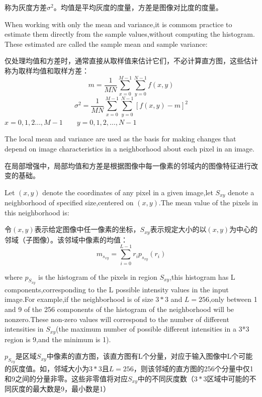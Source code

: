 \documentclass[12pt]{article}
\numberwithin{equation}{section}%
\begin{document}
称为灰度方差$\sigma^{2}$。均值是平均灰度的度量，方差是图像对比度的度量。

When working with only the mean and variance,it is commom practice to estimate them directly from the sample values,without computing the histogram. These estimated are called the sample mean and sample variance:

仅处理均值和方差时，通常直接从取样值来估计它们，不必计算直方图，这些估计称为取样均值和取样方差：
\begin{equation} \label {3.20}
m=\frac{1}{MN}\sum_{x=0}^{M-1}\sum_{y=0}^{N-1}f(x,y)
\end{equation}
\begin{equation} \label {3.21}
\sigma^{2}=\frac{1}{MN}\sum_{x=0}^{M-1}\sum_{y=0}^{N-1}[f(x,y)-m]^{2}
\end{equation}
$x=0,1,2\ldots,M-1\qquad y=0,1,2,\ldots,N-1$

The local mean and variance are used as the basis for making changes that depend on image characteristics in a neighborhood about each pixel in an image.

在局部增强中，局部均值和方差是根据图像中每一像素的邻域内的图像特征进行改变的基础。

Let $(x,y)$ denote the coordinates of any pixel in a given image,let $S_{xy}$ denote a neighborhood of specified size,centered on $(x,y)$.The mean value of the pixels in this neighborhood is:

令$(x,y)$表示给定图像中任一像素的坐标，$S_{xy}$表示规定大小的以$(x,y)$为中心的邻域（子图像）。该邻域中像素的均值：
\begin{equation} \label {3.22}
m_{s_{xy}}=\sum_{i=0}^{L-1}r_{i}p_{s_{xy}}(r_{i})
\end{equation}

where $p_{S_{xy}}$ is the histogram of the pixels in region $S_{xy}$,this histogram has L components,corresponding to the L possible intensity values in the input image.For example,if the neighborhood is of size $3*3$ and $L=256$,only between 1 and 9 of the 256 components of the histogram of the neighborhood will be nonzero.These non-zero values will correspond to the number of different intensities in $S_{xy}$(the maximum number of possible different intensities in a 3*3 region is 9,and the minimum is 1).

$p_{S_{xy}}$是区域$S_{xy}$中像素的直方图，该直方图有L个分量，对应于输入图像中L个可能的灰度值。如，邻域大小为$3*3$且$L=256$，则该邻域的直方图的256个分量中仅1和9之间的分量非零。这些非零值将对应$S_{xy}$中的不同灰度数（$3*3$区域中可能的不同灰度的最大数是9，最小数是1）
\end{document}
